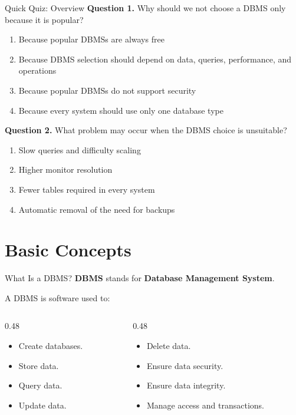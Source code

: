 \documentclass[aspectratio=169,11pt]{beamer}
\newcommand{\keyword}[1]{\textcolor{accent}{\textbf{#1}}}
\newcommand{\kw}[1]{\keyword{#1}}
\newcommand{\smallitem}{\setlength{\itemsep}{2pt}\setlength{\parskip}{0pt}}
\newcommand{\qoption}[2]{\item[#1.] #2}
\begin{document}
\begin{frame}{Quick Quiz: Overview}
\small
\textbf{Question 1.} Why should we not choose a DBMS only because it is popular?
\begin{enumerate}
  \qoption{A}{Because popular DBMSs are always free}
  \qoption{B}{Because DBMS selection should depend on data, queries, performance, and operations}
  \qoption{C}{Because popular DBMSs do not support security}
  \qoption{D}{Because every system should use only one database type}
\end{enumerate}

\textbf{Question 2.} What problem may occur when the DBMS choice is unsuitable?
\begin{enumerate}
  \qoption{A}{Slow queries and difficulty scaling}
  \qoption{B}{Higher monitor resolution}
  \qoption{C}{Fewer tables required in every system}
  \qoption{D}{Automatic removal of the need for backups}
\end{enumerate}
\end{frame}

\section{Basic Concepts}

\begin{frame}{What Is a DBMS?}
\kw{DBMS} stands for \kw{Database Management System}.

\vspace{2mm}
A DBMS is software used to:
\begin{columns}[T]
\begin{column}{0.48\textwidth}
\begin{itemize}
  \smallitem
  \item Create databases.
  \item Store data.
  \item Query data.
  \item Update data.
\end{itemize}
\end{column}
\begin{column}{0.48\textwidth}
\begin{itemize}
  \smallitem
  \item Delete data.
  \item Ensure data security.
  \item Ensure data integrity.
  \item Manage access and transactions.
\end{itemize}
\end{column}
\end{columns}
\end{frame}
\end{document}
